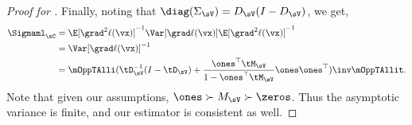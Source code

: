 \begin{proof}[Proof for ]
Finally, noting that $\diag(\Sigma_\sV) = D_\sV (I - D_\sV)$, we get,
\begin{align*}
    \Sigmaml_{\sC} 
      &= \E[\grad^2 \ell(\vx)]^{-1} \Var [\grad \ell(\vx)] \E[\grad^2 \ell(\vx)]^{-1} \\
      &= \Var[\grad \ell(\vx)]^{-1} \\
      &=
        \mOppTAlli (\tD_{\sV}^{-1} (I - \tD_\sV) + \frac{\ones^\top \tM_\sV}{1 - \ones^\top \tM_\sV} \ones\ones^\top)\inv \mOppTAllit.
\end{align*}
Note that given our assumptions, $\ones \succ M_\sV \succ \zeros$. Thus
the asymptotic variance is finite, and our estimator is consistent as
well.

\end{proof}

